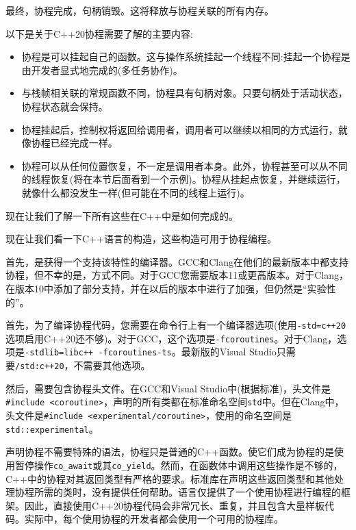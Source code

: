 最终，协程完成，句柄销毁。这将释放与协程关联的所有内存。

以下是关于C++20协程需要了解的主要内容:

\begin{itemize}
\item
协程是可以挂起自己的函数。这与操作系统挂起一个线程不同:挂起一个协程是由开发者显式地完成的(多任务协作)。

\item
与栈帧相关联的常规函数不同，协程具有句柄对象。只要句柄处于活动状态，协程状态就会保持。

\item
协程挂起后，控制权将返回给调用者，调用者可以继续以相同的方式运行，就像协程已经完成一样。 

\item 
协程可以从任何位置恢复，不一定是调用者本身。此外，协程甚至可以从不同的线程恢复(将在本节后面看到一个示例)。协程从挂起点恢复，并继续运行，就像什么都没发生一样(但可能在不同的线程上运行)。
\end{itemize}

现在让我们了解一下所有这些在C++中是如何完成的。


现在让我们看一下C++语言的构造，这些构造可用于协程编程。 

首先，是获得一个支持该特性的编译器。GCC和Clang在他们的最新版本中都支持协程，但不幸的是，方式不同。对于GCC您需要版本11或更高版本。对于Clang，在版本10中添加了部分支持，并在以后的版本中进行了加强，但仍然是“实验性的”。

首先，为了编译协程代码，您需要在命令行上有一个编译器选项(使用\texttt{-std=c++20}选项启用C++20还不够)。对于GCC，这个选项是\texttt{-fcoroutines}。对于Clang，选项是\texttt{-stdlib=libc++ -fcoroutines-ts}。最新版的Visual Studio只需要\texttt{/std:c++20}，不需要其他选项。

然后，需要包含协程头文件。在GCC和Visual Studio中(根据标准)，头文件是\texttt{\#include <coroutine>}，声明的所有类都在标准命名空间\texttt{std}中。但在Clang中，头文件是\texttt{\#include <experimental/coroutine>}，使用的命名空间是\texttt{std::experimental}。

声明协程不需要特殊的语法，协程只是普通的C++函数。使它们成为协程的是使用暂停操作\texttt{co\_await}或其\texttt{co\_yield}。然而，在函数体中调用这些操作是不够的，C++中的协程对其返回类型有严格的要求。标准库在声明这些返回类型和其他处理协程所需的类时，没有提供任何帮助。语言仅提供了一个使用协程进行编程的框架。因此，直接使用C++20协程代码会非常冗长、重复，并且包含大量样板代码。实际中，每个使用协程的开发者都会使用一个可用的协程库。 

